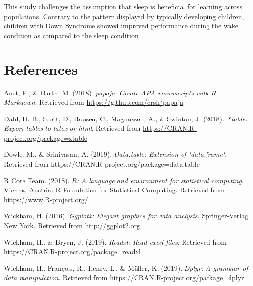 \documentclass[man]{apa6}
\begin{document}
This study challenges the assumption that sleep is beneficial for
learning across populations. Contrary to the pattern displayed by
typically developing children, children with Down Syndrome showed
improved performance during the wake condition as compared to the sleep
condition.

\newpage

\section{References}\label{references}

\begingroup
\setlength{\parindent}{-0.5in} \setlength{\leftskip}{0.5in}

\hypertarget{refs}{}
\hypertarget{ref-R-papaja}{}
Aust, F., \& Barth, M. (2018). \emph{papaja: Create APA manuscripts with
R Markdown}. Retrieved from \url{https://github.com/crsh/papaja}

\hypertarget{ref-R-xtable}{}
Dahl, D. B., Scott, D., Roosen, C., Magnusson, A., \& Swinton, J.
(2018). \emph{Xtable: Export tables to latex or html}. Retrieved from
\url{https://CRAN.R-project.org/package=xtable}

\hypertarget{ref-R-data.table}{}
Dowle, M., \& Srinivasan, A. (2019). \emph{Data.table: Extension of
`data.frame`}. Retrieved from
\url{https://CRAN.R-project.org/package=data.table}

\hypertarget{ref-R-base}{}
R Core Team. (2018). \emph{R: A language and environment for statistical
computing}. Vienna, Austria: R Foundation for Statistical Computing.
Retrieved from \url{https://www.R-project.org/}

\hypertarget{ref-R-ggplot2}{}
Wickham, H. (2016). \emph{Ggplot2: Elegant graphics for data analysis}.
Springer-Verlag New York. Retrieved from \url{http://ggplot2.org}

\hypertarget{ref-R-readxl}{}
Wickham, H., \& Bryan, J. (2019). \emph{Readxl: Read excel files}.
Retrieved from \url{https://CRAN.R-project.org/package=readxl}

\hypertarget{ref-R-dplyr}{}
Wickham, H., François, R., Henry, L., \& Müller, K. (2019). \emph{Dplyr:
A grammar of data manipulation}. Retrieved from
\url{https://CRAN.R-project.org/package=dplyr}

\endgroup
\end{document}
